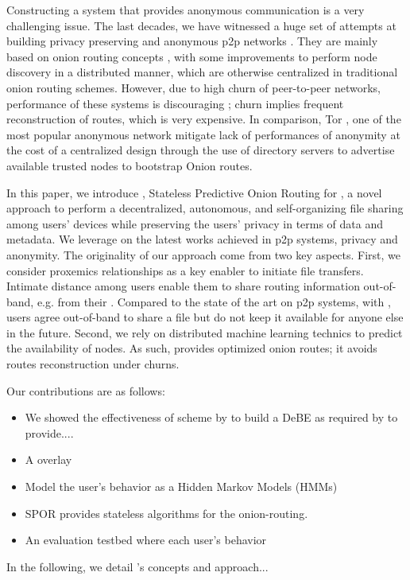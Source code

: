 Constructing a system that provides anonymous communication is a very
challenging issue. The last decades, we have witnessed a
 huge set of attempts at building privacy preserving and anonymous p2p
 networks \cite{Clarke:2001, Gnunet2002, Freedman:2002, Nambiar:2006,
   Rennhard:2002}. They are mainly based on onion
 routing concepts \cite{Chaum:1981}, with some improvements to perform node
 discovery in a distributed manner, which are otherwise
centralized in traditional onion routing schemes. However, due to high
churn of peer-to-peer networks, performance of these systems is
discouraging \cite{LeBlond:2013}; churn implies frequent
reconstruction of routes, which is very expensive. In comparison, Tor
\cite{Dingledine:2004}, one of the most popular anonymous network
mitigate lack of performances of anonymity at the cost of a
centralized design through the use of directory
servers to advertise available trusted nodes to bootstrap Onion
routes. 

In this paper, we introduce \name, Stateless Predictive Onion Routing
for \squad, a novel approach to perform a decentralized, autonomous,
and self-organizing file sharing among users' devices while preserving the users’ privacy
in terms of data and metadata. We leverage on the latest works achieved
in p2p systems, privacy and anonymity. The originality of our approach come
from two key aspects. First, we consider proxemics relationships as a key enabler to initiate file
transfers. Intimate distance among users enable them to share
routing information out-of-band, e.g. from their
\squad. Compared to the state of the art on p2p systems, with \name,
users agree out-of-band to share a file but
do not keep it available for anyone else in the future. Second, we
rely on distributed machine learning technics to predict the
availability of nodes. As such, \name provides optimized onion routes; it avoids routes
reconstruction under churns.

Our contributions are as follows: 
\begin{itemize}
\item We showed the effectiveness of  scheme by \textcite{ANOBE} 
  to build a \ac{DeBE} as required by \name to
  provide.... 
\item A \squad overlay 
\item Model the user’s behavior as a Hidden Markov Models (HMMs)
\item SPOR provides stateless algorithms for the onion-routing.
\item An evaluation testbed where each user’s behavior
\end{itemize}

In the following, we detail \name 's concepts and approach...

